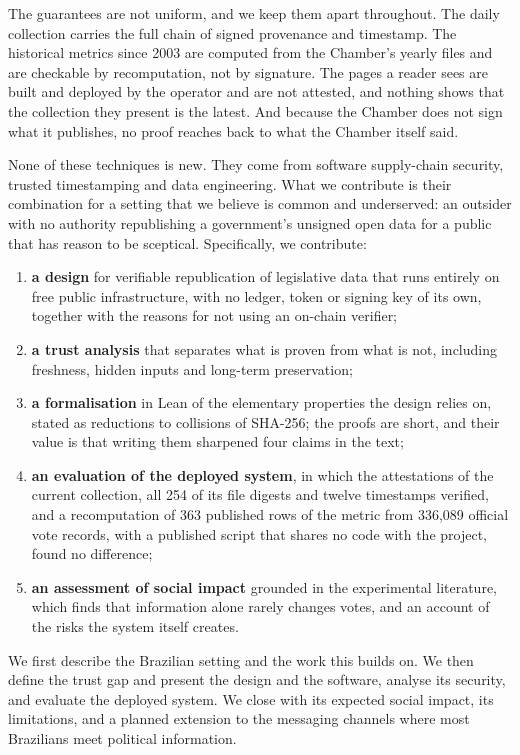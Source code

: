 The guarantees are not uniform, and we keep them apart throughout. The daily collection carries the full chain of signed provenance and timestamp. The historical metrics since 2003 are computed from the Chamber's yearly files and are checkable by recomputation, not by signature. The pages a reader sees are built and deployed by the operator and are not attested, and nothing shows that the collection they present is the latest. And because the Chamber does not sign what it publishes, no proof reaches back to what the Chamber itself said.

None of these techniques is new. They come from software supply-chain security, trusted timestamping and data engineering. What we contribute is their combination for a setting that we believe is common and underserved: an outsider with no authority republishing a government's unsigned open data for a public that has reason to be sceptical. Specifically, we contribute:

\begin{enumerate}[leftmargin=1.6em,itemsep=2pt]
\item \textbf{a design} for verifiable republication of legislative data that runs entirely on free public infrastructure, with no ledger, token or signing key of its own, together with the reasons for not using an on-chain verifier;
\item \textbf{a trust analysis} that separates what is proven from what is not, including freshness, hidden inputs and long-term preservation;
\item \textbf{a formalisation} in Lean of the elementary properties the design relies on, stated as reductions to collisions of SHA-256; the proofs are short, and their value is that writing them sharpened four claims in the text;
\item \textbf{an evaluation of the deployed system}, in which the attestations of the current collection, all 254 of its file digests and twelve timestamps verified, and a recomputation of 363 published rows of the metric from 336,089 official vote records, with a published script that shares no code with the project, found no difference;
\item \textbf{an assessment of social impact} grounded in the experimental literature, which finds that information alone rarely changes votes, and an account of the risks the system itself creates.
\end{enumerate}

We first describe the Brazilian setting and the work this builds on. We then define the trust gap and present the design and the software, analyse its security, and evaluate the deployed system. We close with its expected social impact, its limitations, and a planned extension to the messaging channels where most Brazilians meet political information.
